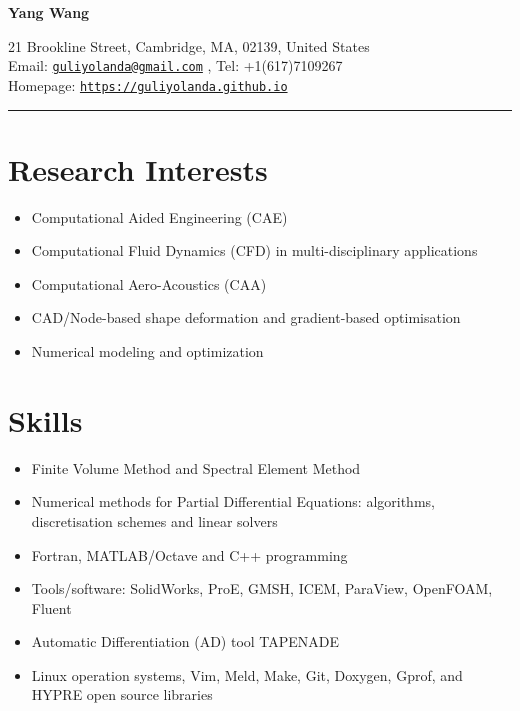 \documentclass[letterpaper]{article}
\def\name{Yang Wang}
\begin{document}

\centerline{\LARGE \bf \name}


\begin{minipage}{\linewidth}
\begin{center}
21 Brookline Street, Cambridge, MA, 02139, United States\\
Email: \href{mailto:guliyolanda@gmail.com}{\tt guliyolanda@gmail.com} , Tel: +1(617)7109267 \\
Homepage:  \href{https://guliyolanda.github.io}{\tt https://guliyolanda.github.io} \\
\end{center}
\end{minipage}

\vspace{0pt}
\rule{\textwidth}{1pt}

\vspace{-12pt}
\section*{Research Interests}
\vspace{-10pt}
\begin{itemize}
\item Computational Aided Engineering (CAE)
\item Computational Fluid Dynamics (CFD) in multi-disciplinary applications
\item Computational Aero-Acoustics (CAA)
\item CAD/Node-based shape deformation and gradient-based optimisation
\item Numerical modeling and optimization
\end{itemize} 

\vspace{-12pt}
\section*{Skills}
\vspace{-10pt}
\begin{itemize}
\item Finite Volume Method and Spectral Element Method
\item Numerical methods for Partial Differential Equations: algorithms, discretisation schemes and linear solvers
\item Fortran, MATLAB/Octave and C++ programming
\item Tools/software: SolidWorks, ProE, GMSH, ICEM, ParaView, OpenFOAM, Fluent
\item Automatic Differentiation (AD) tool TAPENADE
\item Linux operation systems, Vim, Meld, Make, Git, Doxygen, Gprof, and HYPRE open source libraries 
\end{itemize}
\end{document}
